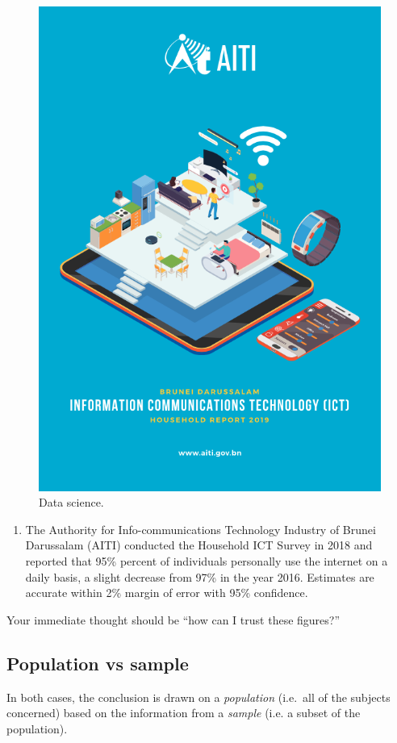\documentclass[
]{book}
\providecommand{\tightlist}{%
  \setlength{\itemsep}{0pt}\setlength{\parskip}{0pt}}
\theoremstyle{definition}
\theoremstyle{definition}
\theoremstyle{definition}
\theoremstyle{definition}
\theoremstyle{remark}
\begin{document}
\begin{figure}

{\centering \includegraphics[width=0.6\linewidth]{figure/00-aiti} 

}

\caption{Data science.}\label{fig:aiti}
\end{figure}

\begin{enumerate}
\def\labelenumi{\arabic{enumi}.}
\setcounter{enumi}{1}
\tightlist
\item
  The Authority for Info-communications Technology Industry of Brunei Darussalam (AITI) conducted the Household ICT Survey in 2018 and reported that 95\% percent of individuals personally use the internet on a daily basis, a slight decrease from 97\% in the year 2016. Estimates are accurate within 2\% margin of error with 95\% confidence.
\end{enumerate}

Your immediate thought should be ``how can I trust these figures?''

\hypertarget{population-vs-sample}{%
\subsection*{Population vs sample}\label{population-vs-sample}}

In both cases, the conclusion is drawn on a \emph{population} (i.e.~all of
the subjects concerned) based on the information from a \emph{sample} (i.e.
a subset of the population).
\end{document}
